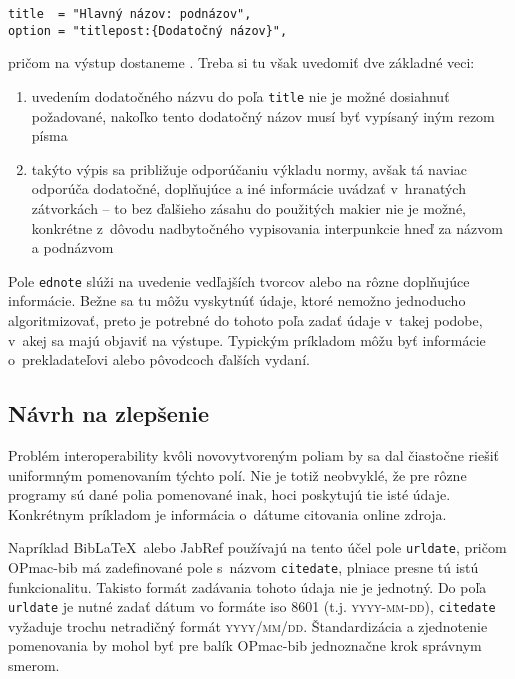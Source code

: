 \documentclass[
  color,
  table,
  nolof,
  oneside,
]{fithesis3}
\begin{document}
\begin{verbatim}
title  = "Hlavný názov: podnázov",
option = "titlepost:{Dodatočný názov}",
\end{verbatim}

\noindent pričom na výstup dostaneme . Treba si tu však uvedomiť dve základné veci:

\begin{enumerate}
\item uvedením dodatočného názvu do poľa \texttt{title} nie je možné dosiahnuť požadované, nakoľko tento dodatočný názov musí byť vypísaný iným rezom písma
\item takýto výpis sa približuje odporúčaniu výkladu normy, avšak tá naviac odporúča dodatočné, doplňujúce a iné informácie uvádzať v~hranatých zátvorkách -- to bez ďalšieho zásahu do použitých makier nie je možné, konkrétne z~dôvodu nadbytočného vypisovania interpunkcie hneď za názvom a podnázvom
\end{enumerate}

Pole \texttt{ednote} slúži na uvedenie vedľajších tvorcov alebo na rôzne doplňujúce informácie. Bežne sa tu môžu vyskytnúť údaje, ktoré nemožno jednoducho algoritmizovať, preto je potrebné do tohoto poľa zadať údaje v~takej podobe, v~akej sa majú objaviť na výstupe. Typickým príkladom môžu byť informácie o~prekladateľovi alebo pôvodcoch ďalších vydaní.

\subsection{Návrh na zlepšenie}

Problém interoperability kvôli novovytvoreným poliam by sa dal čiastočne riešiť uniformným pomenovaním týchto polí. Nie je totiž neobvyklé, že pre rôzne programy sú dané polia pomenované inak, hoci poskytujú tie isté údaje. Konkrétnym príkladom je informácia o~dátume citovania online zdroja.

Napríklad Bib\LaTeX\ alebo JabRef používajú na tento účel pole \texttt{urldate}, pričom OPmac-bib má zadefinované pole s~názvom \texttt{citedate}, plniace presne tú istú funkcionalitu. Takisto formát zadávania tohoto údaja nie je jednotný. Do poľa \texttt{urldate} je nutné zadať dátum vo formáte \gls{iso} 8601 (t.j. \textsc{yyyy-mm-dd}), \texttt{citedate} vyžaduje trochu netradičný formát \textsc{yyyy/mm/dd}. Štandardizácia a zjednotenie pomenovania by mohol byť pre balík OPmac-bib jednoznačne krok správnym smerom.
\end{document}
